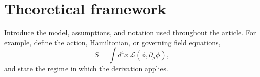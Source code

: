 \section{Theoretical framework}
\label{sec:theory}

Introduce the model, assumptions, and notation used throughout the article.
For example, define the action, Hamiltonian, or governing field equations,
\begin{equation}
  S = \int d^4x\,\mathcal{L}(\phi,\partial_\mu \phi),
  \label{eq:action}
\end{equation}
and state the regime in which the derivation applies.

